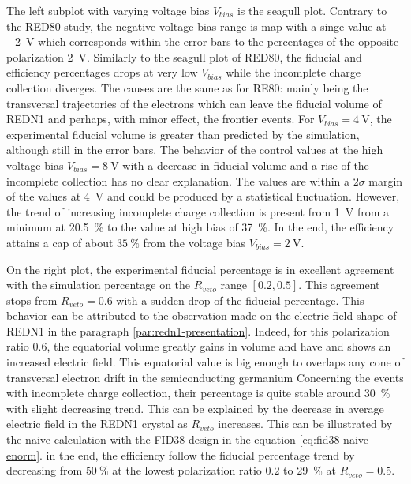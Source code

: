 The left subplot with varying voltage bias $V_{bias}$ is the seagull plot. Contrary to the RED80 study, the negative voltage bias range is map with a singe value at \SI{-2}{\volt} which corresponds within the error bars to the percentages of the opposite polarization \SI{2}{\volt}. Similarly to the seagull plot of RED80, the fiducial and efficiency percentages drops at very low $V_{bias}$ while the incomplete charge collection diverges. The causes are the same as for RE80: mainly being the transversal trajectories of the electrons which can leave the fiducial volume of REDN1 and perhaps, with minor effect, the frontier events.
For $V_{bias}=\SI{4}{\volt}$, the  experimental fiducial volume is greater than predicted by the simulation, although still in the error bars.
The behavior of the control values at the high voltage bias $V_{bias} = \SI{8}{\volt}$ with a decrease in fiducial volume and a rise of the incomplete collection has no clear explanation. The values are within a $2\sigma$ margin of the values at \SI{4}{\volt} and could be produced by a statistical fluctuation.
However, the trend of increasing incomplete charge collection is present from \SI{1}{\volt} from a minimum at \SI{20.5}{\percent} to the value at high bias of \SI{37}{\percent}.
In the end, the efficiency attains a cap of about $\SI{35}{\percent}$ from the voltage bias $V_{bias} = \SI{2}{\volt}$.

On the right plot, the experimental fiducial percentage is in excellent agreement with the simulation percentage on the $R_{veto}$ range $[0.2, 0.5]$. This agreement stops from $R_{veto} = 0.6$ with a sudden drop of the fiducial percentage. This behavior can be attributed to the observation made on the electric field shape of REDN1 in the paragraph \ref{par:redn1-presentation}. Indeed, for this polarization ratio $0.6$, the equatorial volume greatly gains in volume and have and shows an increased electric field. This equatorial value is big enough to overlaps any cone of transversal electron drift in the semiconducting germanium
 Concerning the events with incomplete charge collection, their percentage is quite stable around \SI{30}{\percent} with slight decreasing trend. This can be explained by the decrease in average electric field in the REDN1 crystal as $R_{veto}$ increases. This can be illustrated by the naive calculation with the FID38 design in the equation \ref{eq:fid38-naive-enorm}. 
in the end, the efficiency follow the fiducial percentage trend by decreasing from $\SI{50}{\percent}$ at the lowest polarization ratio $0.2$ to \SI{29}{\percent} at $R_{veto}=0.5$.

